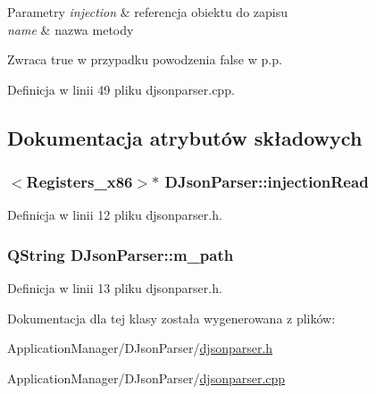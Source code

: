 \begin{DoxyParams}{Parametry}
{\em injection} & referencja obiektu do zapisu \\
\hline
{\em name} & nazwa metody \\
\hline
\end{DoxyParams}
\begin{DoxyReturn}{Zwraca}
true w przypadku powodzenia false w p.\-p. 
\end{DoxyReturn}


Definicja w linii 49 pliku djsonparser.\-cpp.



\subsection{Dokumentacja atrybutów składowych}
\hypertarget{class_d_json_parser_abfae3a66c00ce3bf5f2dc5eab570a642}{
\subsubsection[{injection\-Read}]{$<${\bf Registers\-\_\-x86}$>$$\ast$ D\-Json\-Parser\-::injection\-Read\hspace{0.3cm}{\ttfamily [private]}}}\label{class_d_json_parser_abfae3a66c00ce3bf5f2dc5eab570a642}


Definicja w linii 12 pliku djsonparser.\-h.

\hypertarget{class_d_json_parser_ac25fee79111d7700fa5ab08414d2c0d0}{
\subsubsection[{m\-\_\-path}]{\setlength{\rightskip}{0pt plus 5cm}Q\-String D\-Json\-Parser\-::m\-\_\-path\hspace{0.3cm}{\ttfamily [private]}}}\label{class_d_json_parser_ac25fee79111d7700fa5ab08414d2c0d0}


Definicja w linii 13 pliku djsonparser.\-h.



Dokumentacja dla tej klasy została wygenerowana z plików\-:\begin{DoxyCompactItemize}
\item 
Application\-Manager/\-D\-Json\-Parser/\hyperlink{djsonparser_8h}{djsonparser.\-h}\item 
Application\-Manager/\-D\-Json\-Parser/\hyperlink{djsonparser_8cpp}{djsonparser.\-cpp}\end{DoxyCompactItemize}
